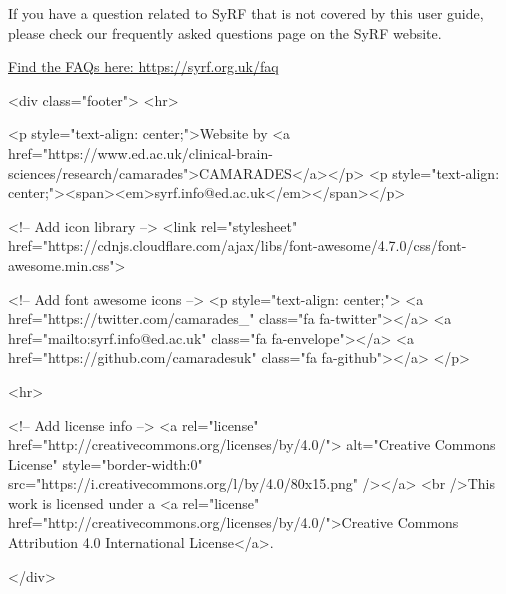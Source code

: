 \documentclass[
]{book}
\begin{document}
If you have a question related to SyRF that is not covered by this user guide, please check our frequently asked questions page on the SyRF website.

\href{https://syrf.org.uk/faq}{Find the FAQs here: https://syrf.org.uk/faq}

  

<div class="footer">
<hr>



<p style="text-align: center;">Website by <a href="https://www.ed.ac.uk/clinical-brain-sciences/research/camarades">CAMARADES</a></p>
<p style="text-align: center;"><span><em>syrf.info@ed.ac.uk</em></span></p>




<!-- Add icon library -->
<link rel="stylesheet" href="https://cdnjs.cloudflare.com/ajax/libs/font-awesome/4.7.0/css/font-awesome.min.css">



<!-- Add font awesome icons -->
<p style="text-align: center;">
<a href="https://twitter.com/camarades_" class="fa fa-twitter"></a>
<a href="mailto:syrf.info@ed.ac.uk" class="fa fa-envelope"></a>
<a href="https://github.com/camaradesuk" class="fa fa-github"></a>
</p>



<hr>



<!-- Add license info -->
<a rel="license" href="http://creativecommons.org/licenses/by/4.0/"> alt="Creative Commons License" style="border-width:0" src="https://i.creativecommons.org/l/by/4.0/80x15.png" /></a>
<br />This work is licensed under a <a rel="license" href="http://creativecommons.org/licenses/by/4.0/">Creative Commons Attribution 4.0 International License</a>.




</div>
\end{document}
